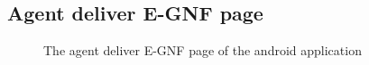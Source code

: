 \documentclass[11pt, a4paper]{article}
\begin{document}
\begin{appendices}
\subsection{Agent deliver E-GNF page} %
\begin{figure}[ht]
\centering
{}
\caption{The agent deliver E-GNF page of the android application}
\end{figure}
\clearpage


\end{appendices}
\end{document}
